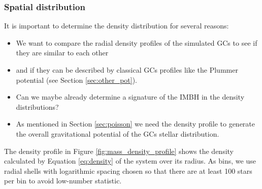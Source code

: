 \subsubsection{Spatial distribution}\label{sec:spatial_dist}
It is important to determine the density distribution for several reasons:
\begin{itemize}
\item We want to compare the radial density profiles of the simulated \acp{GC} to see if they are similar to each other
\item and if they can be described by classical \acp{GC} profiles like the Plummer potential (see Section \ref{sec:other_pot}).
\item Can we maybe already determine a signature of the \ac{IMBH} in the density distributions?
\item As mentioned in Section \ref{sec:poisson} we need the density profile to generate the overall gravitational potential of the \acp{GC} stellar distribution. 
\end{itemize}
The density profile in Figure \ref{fig:mass_density_profile} shows the density calculated by Equation \eqref{eq:density} of the system over its radius. As bins, we use radial shells with logarithmic spacing chosen so that there are at least 100 stars per bin to avoid low-number statistic. 

